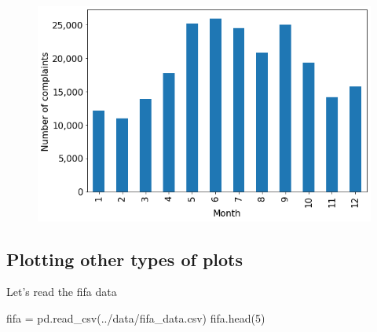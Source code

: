\documentclass[
  letterpaper,
  DIV=11,
  numbers=noendperiod]{scrreprt}
\newenvironment{Shaded}{\begin{snugshade}}{\end{snugshade}}
\newcommand{\DecValTok}[1]{\textcolor[rgb]{0.68,0.00,0.00}{#1}}
\newcommand{\NormalTok}[1]{\textcolor[rgb]{0.00,0.23,0.31}{#1}}
\newcommand{\OperatorTok}[1]{\textcolor[rgb]{0.37,0.37,0.37}{#1}}
\newcommand{\StringTok}[1]{\textcolor[rgb]{0.13,0.47,0.30}{#1}}
\begin{document}
\begin{figure}[H]

{\centering \includegraphics{Data visualization_files/figure-pdf/cell-21-output-1.png}

}

\end{figure}

\hypertarget{plotting-other-types-of-plots}{%
\subsection{Plotting other types of
plots}\label{plotting-other-types-of-plots}}

Let's read the fifa data

\begin{Shaded}
\begin{Highlighting}[]
\NormalTok{fifa }\OperatorTok{=}\NormalTok{ pd.read\_csv(}\StringTok{\textquotesingle{}../data/fifa\_data.csv\textquotesingle{}}\NormalTok{)}
\NormalTok{fifa.head(}\DecValTok{5}\NormalTok{)}
\end{Highlighting}
\end{Shaded}
\end{document}
